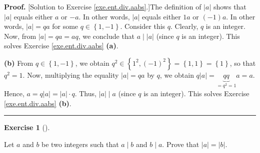 \documentclass[numbers=enddot,12pt,final,onecolumn,notitlepage]{scrartcl}%
\newcounter{exer}
\numberwithin{exer}{subsection}
\theoremstyle{definition}
\newtheorem{exmp}[exer]{Exercise}
\newenvironment{exercise}[1][]
{\begin{exmp}[#1]\begin{leftbar}}
{\end{leftbar}\end{exmp}}
\newenvironment{fineprint}{\begin{small}}{\end{small}}
\newenvironment{proof}[1][Proof]{\noindent\textbf{#1.} }{\ \rule{0.5em}{0.5em}}
\begin{document}
\begin{fineprint}
\begin{proof}
[Solution to Exercise \ref{exe.ent.div.aabs}.]The definition of $\left\vert
a\right\vert $ shows that $\left\vert a\right\vert $ equals either $a$ or
$-a$. In other words, $\left\vert a\right\vert $ equals either $1a$ or
$\left(  -1\right)  a$. In other words, $\left\vert a\right\vert =qa$ for some
$q\in\left\{  1,-1\right\}  $. Consider this $q$. Clearly, $q$ is an integer.
Now, from $\left\vert a\right\vert =qa=aq$, we conclude that $a\mid\left\vert
a\right\vert $ (since $q$ is an integer). This solves Exercise
\ref{exe.ent.div.aabs} \textbf{(a)}.

\textbf{(b)} From $q\in\left\{  1,-1\right\}  $, we obtain $q^{2}\in\left\{
1^{2},\left(  -1\right)  ^{2}\right\}  =\left\{  1,1\right\}  =\left\{
1\right\}  $, so that $q^{2}=1$. Now, multiplying the equality $\left\vert
a\right\vert =qa$ by $q$, we obtain $q\left\vert a\right\vert =\underbrace{qq}%
_{=q^{2}=1}a=a$. Hence, $a=q\left\vert a\right\vert =\left\vert a\right\vert
\cdot q$. Thus, $\left\vert a\right\vert \mid a$ (since $q$ is an integer).
This solves Exercise \ref{exe.ent.div.aabs} \textbf{(b)}.
\end{proof}
\end{fineprint}

\begin{exercise}
\label{exe.ent.div.abba}Let $a$ and $b$ be two integers such that $a\mid b$
and $b\mid a$. Prove that $\left\vert a\right\vert =\left\vert b\right\vert $.
\end{exercise}
\end{document}
